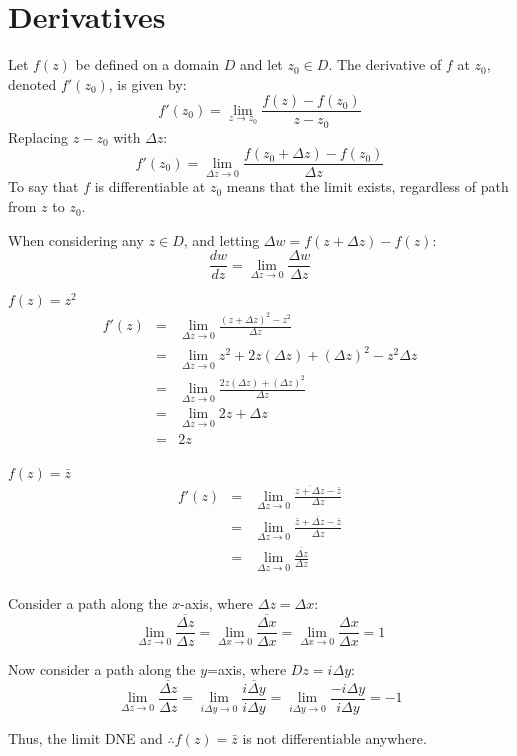 \documentclass[letterpaper,12pt,fleqn]{article}
\newcommand{\D}{\Delta}
\newcommand{\limz}{\lim_{z\to z_0}}
\newcommand{\limdz}{\lim_{\D z\to0}}
\newcommand{\limdx}{\lim_{\D x\to0}}
\newcommand{\limdiy}{\lim_{i\D y\to0}}
\begin{document}
\section*{Derivatives}

\begin{definition}
  Let $f(z)$ be defined on a domain $D$ and let $z_0\in D$. The derivative of
  $f$ at $z_0$, denoted $f'(z_0)$, is given by:
  \[f'(z_0)=\limz{\frac{f(z)-f(z_0)}{z-z_0}}\]
  Replacing $z-z_0$ with $\D z$:
  \[f'(z_0)=\limdz{\frac{f(z_0+\D z)-f(z_0)}{\D z}}\]
  To say that $f$ is differentiable at $z_0$ means that the limit exists,
  regardless of path from $z$ to $z_0$.
\end{definition}

When considering any $z\in D$, and letting $\D w=f(z+\D z)-f(z)$:
\[\frac{dw}{dz}=\limdz{\frac{\D w}{\D z}}\]

\begin{example}
  $f(z)=z^2$
  \begin{eqnarray*}
    f'(z) &=& \limdz{\frac{(z+\D z)^2-z^2}{\D z}} \\
    &=& \limdz{{z^2+2z(\D z)+(\D z)^2-z^2}{\D z}} \\
    &=& \limdz{\frac{2z(\D z)+(\D z)^2}{\D z}} \\
    &=& \limdz{2z+\D z} \\
    &=& 2z \\
  \end{eqnarray*}
\end{example}

\begin{example}
  $f(z)=\bar{z}$
  \begin{eqnarray*}
    f'(z) &=& \limdz{\frac{\overline{z+\D z}-\bar{z}}{\D z}} \\
    &=& \limdz{\frac{\bar{z}+\overline{\D z}-\bar{z}}{\D z}} \\
    &=& \limdz{\frac{\overline{\D z}}{\D z}} \\
  \end{eqnarray*}

  Consider a path along the $x$-axis, where $\D z=\D x$:
  \[\limdz{\frac{\overline{\D z}}{\D z}}=\limdx{\frac{\overline{\D x}}{\D x}}=
  \limdx{\frac{\D x}{\D x}}=1\]

  Now consider a path along the $y$=axis, where $D z=i\D y$:
  \[\limdz{\frac{\overline{\D z}}{\D z}}=
  \limdiy{\frac{\overline{i\D y}}{i\D y}}=
  \limdiy{\frac{-i\D y}{i\D y}}=-1\]

  Thus, the limit DNE and $\therefore f(z)=\bar{z}$ is not differentiable
  anywhere.
\end{example}
\end{document}
